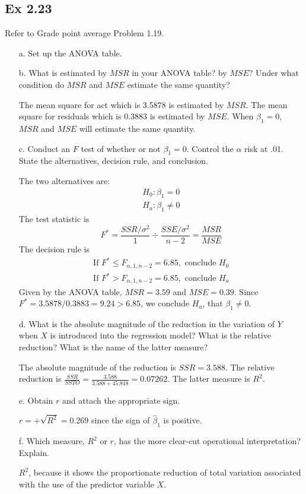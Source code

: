 \documentclass[10pt]{report}
\begin{document}
\subsection*{Ex 2.23}
Refer to Grade point average Problem 1.19.
\begin{enumerate}
	\item [a.]
	Set up the ANOVA table.
	
	
	\item [b.]
	What is estimated by $MSR$ in your ANOVA table? by $MSE$? Under what condition do $MSR$ and $MSE$ estimate the same quantity?
	
	The mean square for act which is 3.5878 is estimated by $MSR$. The mean square for residuals which is 0.3883 is estimated by $MSE$. When $\beta_1 = 0$, $MSR$ and $MSE$ will estimate the same quantity.
	
	\item [c.]
	Conduct an $F$ test of whether or not $\beta_1 = 0$. Control the $\alpha$ risk at .01. State the alternatives, decision rule, and conclusion.
	
	The two alternatives are:
	\begin{align*}
		H_0: \beta_1 = 0\\
		H_a: \beta_1 \ne 0
	\end{align*}
	The test statistic is
	\[
	F^* = \frac{SSR/\sigma^2}{1} \div \frac{SSE/\sigma^2}{n-2} = \frac{MSR}{MSE}
	\]
	The decision rule is
	\begin{align*}
		\text{If } F^* \le F_{\alpha, 1, n-2} = 6.85, \text{ conclude } H_0\\
		\text{If } F^* > F_{\alpha, 1, n-2} = 6.85, \text{ conclude } H_a
	\end{align*}
	Given by the ANOVA table, $MSR = 3.59$ and $MSE = 0.39$. Since $F^* = 3.5878/0.3883 = 9.24 > 6.85$, we conclude $H_a$, that $\beta_1 \ne 0$.
	
	\item [d.]
	What is the absolute magnitude of the reduction in the variation of $Y$ when $X$ is introduced into the regression model? What is the relative reduction? What is the name of the latter measure?
	
	
	The absolute magnitude of the reduction is $SSR = 3.588$. The relative reduction is $\frac{SSR}{SSTO} = \frac{3.588}{3.588+45.818} = 0.07262$. The latter measure is $R^2$.
	
	\item [e.]
	Obtain $r$ and attach the appropriate sign.
	
	$r = +\sqrt{R^2} = 0.269$ since the sign of $\hat{\beta}_1$ is positive.
	
	\item [f.]
	Which measure, $R^2$ or $r$, has the more clear-cut operational interpretation? Explain.
	
	$R^2$, because it shows the proportionate reduction of total variation associated with the use of the predictor variable $X$.
\end{enumerate}
\end{document}
